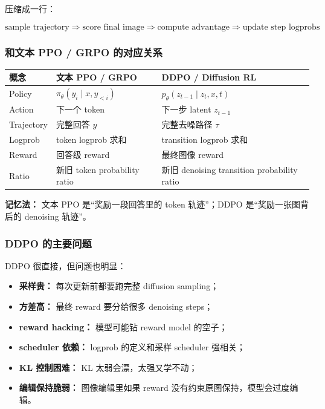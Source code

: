 压缩成一行：

\[
\text{sample trajectory}
\Rightarrow
\text{score final image}
\Rightarrow
\text{compute advantage}
\Rightarrow
\text{update step logprobs}
\]

\subsubsection{和文本 PPO / GRPO 的对应关系}

\begin{center}
{\small
\begin{tabular}{p{3cm}p{4.8cm}p{4.8cm}}
\hline
\textbf{概念} & \textbf{文本 PPO / GRPO} & \textbf{DDPO / Diffusion RL} \\
\hline
Policy
&
$\pi_\theta(y_i\mid x,y_{<i})$
&
$p_\theta(z_{t-1}\mid z_t,x,t)$
\\
Action
&
下一个 token
&
下一步 latent $z_{t-1}$
\\
Trajectory
&
完整回答 $y$
&
完整去噪路径 $\tau$
\\
Logprob
&
token logprob 求和
&
transition logprob 求和
\\
Reward
&
回答级 reward
&
最终图像 reward
\\
Ratio
&
新旧 token probability ratio
&
新旧 denoising transition probability ratio
\\
\hline
\end{tabular}
}
\end{center}

\begin{intubox}
\textbf{记忆法：} 文本 PPO 是“奖励一段回答里的 token 轨迹”；DDPO 是“奖励一张图背后的 denoising 轨迹”。
\end{intubox}

\subsubsection{DDPO 的主要问题}

DDPO 很直接，但问题也明显：

\begin{itemize}[leftmargin=1.5em]
  \item \textbf{采样贵：} 每次更新前都要跑完整 diffusion sampling；
  \item \textbf{方差高：} 最终 reward 要分给很多 denoising steps；
  \item \textbf{reward hacking：} 模型可能钻 reward model 的空子；
  \item \textbf{scheduler 依赖：} logprob 的定义和采样 scheduler 强相关；
  \item \textbf{KL 控制困难：} KL 太弱会漂，太强又学不动；
  \item \textbf{编辑保持脆弱：} 图像编辑里如果 reward 没有约束原图保持，模型会过度编辑。
\end{itemize}

